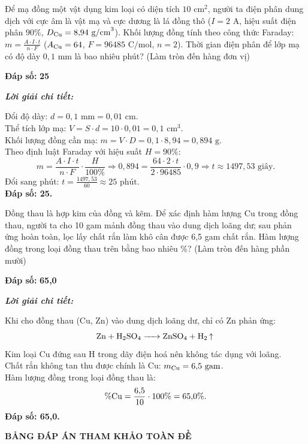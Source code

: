 \documentclass[11pt,a4paper]{article}
\def\loigiai#1{
\par\begingroup\color{blue!80!black}\small
\noindent\textbf{\textit{Lời giải chi tiết:}}\par
#1\par\endgroup}
\begin{document}
\begin{ex}
Để mạ đồng một vật dụng kim loại có diện tích $10\text{ cm}^2$, người ta điện phân dung dịch  với cực âm là vật mạ và cực dương là lá đồng thô ($I = 2\text{ A}$, hiệu suất điện phân $90\%$, $D_{\ce{Cu}} = 8{,}94\text{ g/cm}^3$). Khối lượng đồng tính theo công thức Faraday: $m = \frac{A \cdot I \cdot t}{n \cdot F}$ ($A_{\ce{Cu}} = 64$, $F = 96485\text{ C/mol}$, $n = 2$). Thời gian điện phân để lớp mạ có độ dày $0{,}1\text{ mm}$ là bao nhiêu phút? (Làm tròn đến hàng đơn vị)
\par\noindent\textbf{Đáp số:} \textbf{\color{red}25}
\loigiai{
Đổi độ dày: $d = 0{,}1\text{ mm} = 0{,}01\text{ cm}$.\\
Thể tích lớp mạ: $V = S \cdot d = 10 \cdot 0{,}01 = 0{,}1\text{ cm}^3$.\\
Khối lượng đồng cần mạ: $m = V \cdot D = 0{,}1 \cdot 8{,}94 = 0{,}894\text{ g}$.\\
Theo định luật Faraday với hiệu suất $H = 90\%$:
$$m = \frac{A \cdot I \cdot t}{n \cdot F} \cdot \frac{H}{100\%} \Rightarrow 0{,}894 = \frac{64 \cdot 2 \cdot t}{2 \cdot 96485} \cdot 0{,}9 \Rightarrow t \approx 1497{,}53\text{ giây.}$$
Đổi sang phút: $t = \frac{1497{,}53}{60} \approx 25\text{ phút}$.\\
\textbf{Đáp số: 25.}}
\end{ex}

\begin{ex}
Đồng thau là hợp kim của đồng và kẽm. Để xác định hàm lượng Cu trong đồng thau, người ta cho 10 gam mảnh đồng thau vào dung dịch  loãng dư; sau phản ứng hoàn toàn, lọc lấy chất rắn làm khô cân được 6,5 gam chất rắn. Hàm lượng đồng trong loại đồng thau trên bằng bao nhiêu \%? (Làm tròn đến hàng phần mười)
\par\noindent\textbf{Đáp số:} \textbf{\color{red}65,0}
\loigiai{
Khi cho đồng thau (Cu, Zn) vào dung dịch  loãng dư, chỉ có Zn phản ứng:
$$\ce{Zn + H2SO4 -> ZnSO4 + H2 ^}$$
Kim loại Cu đứng sau H trong dãy điện hoá nên không tác dụng với \ce{H2SO4} loãng.\\
Chất rắn không tan thu được chính là Cu: $m_{\ce{Cu}} = 6{,}5\text{ gam}$.\\
Hàm lượng đồng trong loại đồng thau là:
$$\%\ce{Cu} = \frac{6{,}5}{10} \cdot 100\% = 65{,}0\%.$$
\textbf{Đáp số: 65,0.}}
\end{ex}


\vspace{0.3cm}
\noindent
\textbf{\color{hfRed}\large BẢNG ĐÁP ÁN THAM KHẢO TOÀN ĐỀ}
\end{document}
